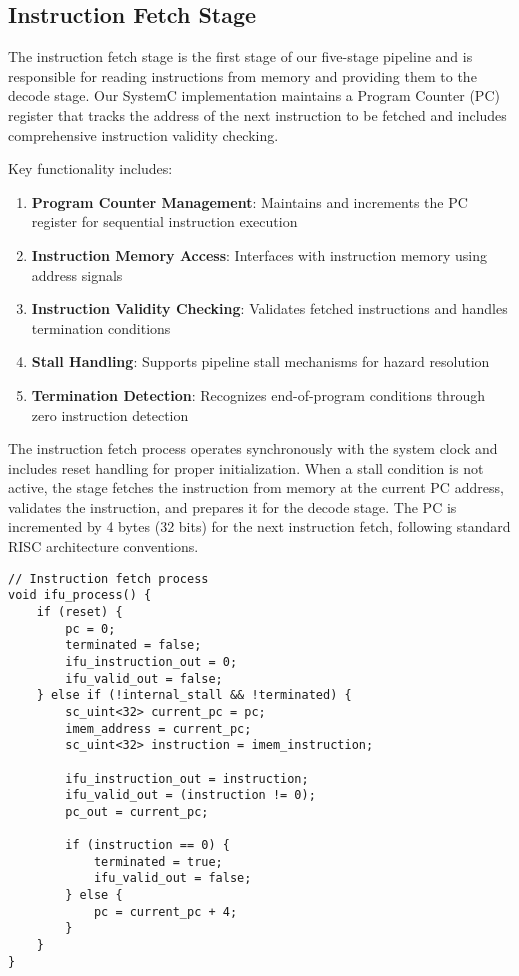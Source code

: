 \subsection{Instruction Fetch Stage}
\label{subsec:instruction_fetch}

The instruction fetch stage is the first stage of our five-stage pipeline and is responsible for reading instructions from memory and providing them to the decode stage. Our SystemC implementation maintains a Program Counter (PC) register that tracks the address of the next instruction to be fetched and includes comprehensive instruction validity checking.

Key functionality includes:
\begin{enumerate}
    \item \textbf{Program Counter Management}: Maintains and increments the PC register for sequential instruction execution
    \item \textbf{Instruction Memory Access}: Interfaces with instruction memory using address signals
    \item \textbf{Instruction Validity Checking}: Validates fetched instructions and handles termination conditions
    \item \textbf{Stall Handling}: Supports pipeline stall mechanisms for hazard resolution
    \item \textbf{Termination Detection}: Recognizes end-of-program conditions through zero instruction detection
\end{enumerate}

The instruction fetch process operates synchronously with the system clock and includes reset handling for proper initialization. When a stall condition is not active, the stage fetches the instruction from memory at the current PC address, validates the instruction, and prepares it for the decode stage. The PC is incremented by 4 bytes (32 bits) for the next instruction fetch, following standard RISC architecture conventions.

\begin{lstlisting}[caption={Instruction Fetch Process}]
// Instruction fetch process
void ifu_process() {
    if (reset) {
        pc = 0;
        terminated = false;
        ifu_instruction_out = 0;
        ifu_valid_out = false;
    } else if (!internal_stall && !terminated) {
        sc_uint<32> current_pc = pc;
        imem_address = current_pc;
        sc_uint<32> instruction = imem_instruction;
        
        ifu_instruction_out = instruction;
        ifu_valid_out = (instruction != 0);
        pc_out = current_pc;
        
        if (instruction == 0) {
            terminated = true;
            ifu_valid_out = false;
        } else {
            pc = current_pc + 4;
        }
    }
}
\end{lstlisting}

